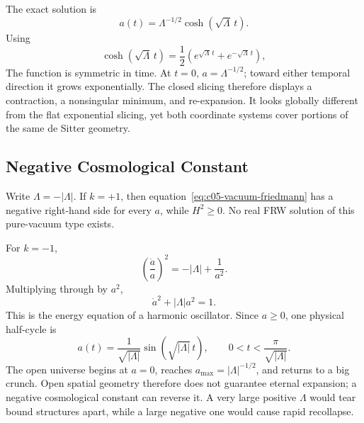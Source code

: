 The exact solution is
\begin{equation}
a(t)=\Lambda^{-1/2}\cosh(\sqrt{\Lambda}\,t).
\label{eq:c05-closed-desitter}
\end{equation}
Using
\begin{equation}
\cosh(\sqrt{\Lambda}\,t)
=
\frac12\left(e^{\sqrt{\Lambda}\,t}+e^{-\sqrt{\Lambda}\,t}\right),
\end{equation}
The function is symmetric in time. At \(t=0\), \(a=\Lambda^{-1/2}\); toward either temporal direction it grows exponentially. The closed slicing therefore displays a contraction, a nonsingular minimum, and re-expansion. It looks globally different from the flat exponential slicing, yet both coordinate systems cover portions of the same de Sitter geometry.

\subsection{Negative Cosmological Constant}

Write \(\Lambda=-|\Lambda|\). If \(k=+1\), then equation~\eqref{eq:c05-vacuum-friedmann} has a negative right-hand side for every \(a\), while \(H^2\geq0\). No real FRW solution of this pure-vacuum type exists.

For \(k=-1\),
\begin{equation}
\left(\frac{\dot a}{a}\right)^2=-|\Lambda|+\frac{1}{a^2}.
\end{equation}
Multiplying through by \(a^2\),
\begin{equation}
\dot a^2+|\Lambda|a^2=1.
\label{eq:c05-negative-lambda-oscillator}
\end{equation}
This is the energy equation of a harmonic oscillator. Since \(a\geq0\), one physical half-cycle is
\begin{equation}
a(t)=\frac{1}{\sqrt{|\Lambda|}}
\sin\!\left(\sqrt{|\Lambda|}\,t\right),
\qquad
0<t<\frac{\pi}{\sqrt{|\Lambda|}}.
\end{equation}
The open universe begins at \(a=0\), reaches \(a_{\max}=|\Lambda|^{-1/2}\), and returns to a big crunch. Open spatial geometry therefore does not guarantee eternal expansion; a negative cosmological constant can reverse it. A very large positive \(\Lambda\) would tear bound structures apart, while a large negative one would cause rapid recollapse.

